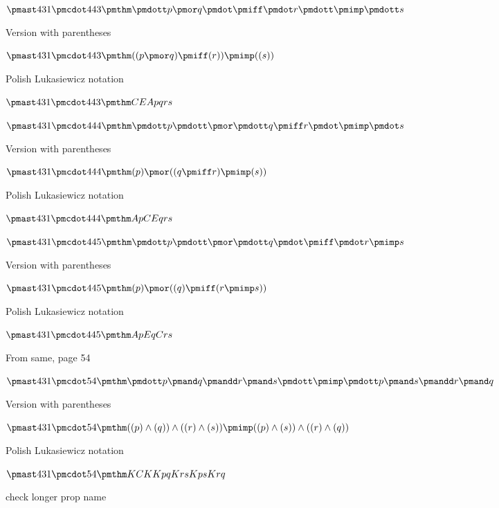 \documentclass[12pt]{article}
\begin{document}
$\pmast 431 \pmcdot 443 \pmthm \pmdott p \pmor q \pmdot \pmiff \pmdot r \pmdott \pmimp \pmdott s$
 
 

Version with parentheses

$\pmast 431 \pmcdot 443 \pmthm  ((  p \pmor q  ) \pmiff (  r  )) \pmimp ((  s))$


Polish Lukasiewicz notation

$\pmast 431 \pmcdot 443 \pmthm  C    E    A   p   q    r    s $


$\pmast 431 \pmcdot 444 \pmthm \pmdott p \pmdott \pmor \pmdott q \pmiff r \pmdot \pmimp \pmdot s$
 
 

Version with parentheses

$\pmast 431 \pmcdot 444 \pmthm  (  p  ) \pmor ((  q \pmiff r  ) \pmimp (  s))$


Polish Lukasiewicz notation

$\pmast 431 \pmcdot 444 \pmthm  A   p     C    E   q   r    s $


$\pmast 431 \pmcdot 445 \pmthm \pmdott p \pmdott \pmor \pmdott q \pmdot \pmiff \pmdot r \pmimp s$
 
 

Version with parentheses

$\pmast 431 \pmcdot 445 \pmthm  (  p  ) \pmor ((  q  ) \pmiff (  r \pmimp s))$


Polish Lukasiewicz notation

$\pmast 431 \pmcdot 445 \pmthm  A   p     E   q     C   r   s $


From same, page 54

$\pmast 431 \pmcdot 54 \pmthm \pmdott p \pmand q \pmandd r \pmand s \pmdott \pmimp \pmdott p \pmand s \pmandd r \pmand q $ 
 
 

Version with parentheses

$\pmast 431 \pmcdot 54 \pmthm  ((  p ) \land ( q )) \land (( r ) \land ( s  )) \pmimp ((  p ) \land ( s )) \land (( r ) \land ( q  ))$


Polish Lukasiewicz notation

$\pmast 431 \pmcdot 54 \pmthm  K    C    K    K   p   q    K   r   s     K   p   s    K   r   q   $


check longer prop name

 
\end{document}
